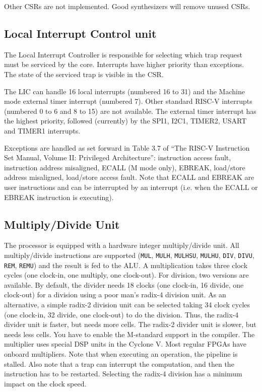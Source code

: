 \documentclass[12pt]{article}
\begin{document}
Other CSRs are not implemented. Good synthesizers will remove unused CSRs.

\subsection{Local Interrupt Control unit}
The Local Interrupt Controller is responsible for selecting which trap request must be serviced by the core. Interrupts have higher priority than exceptions. The state of the serviced trap is visible in the CSR.

The LIC can handle 16 local interrupts (numbered 16 to 31) and the Machine mode external timer interrupt (numbered 7). Other standard RISC-V interrupts (numbered 0 to 6 and 8 to 15) are not available. The external timer interrupt has the highest priority, followed (currently) by the SPI1, I2C1, TIMER2, USART and TIMER1 interrupts.

Exceptions are handled as set forward in Table 3.7 of ``The RISC-V Instruction Set Manual, Volume II: Privileged Architecture'': instruction access fault, instruction address misaligned, ECALL (M mode only), EBREAK, load/store address misaligned, load/store access fault. Note that ECALL and EBREAK are user instructions and can be interrupted by an interrupt (i.e. when the ECALL or EBREAK instruction is executing).

\subsection{Multiply/Divide Unit}
The processor is equipped with a hardware integer multiply/divide unit. All multiply/divide instructions are supported (\lstinline|MUL|, \lstinline|MULH|, \lstinline|MULHSU|, \lstinline|MULHU|, \lstinline|DIV|, \lstinline|DIVU|, \lstinline|REM|, \lstinline|REMU|) and the result is fed to the ALU. A multiplication takes three clock cycles (one clock-in, one multiply, one clock-out). For division, two versions are available. By default, the divider needs 18 clocks (one clock-in, 16 divide, one clock-out) for a division using a poor man's radix-4 division unit. As an alternative, a simple radix-2 division unit can be selected taking 34 clock cycles (one clock-in, 32 divide, one clock-out) to do the division.  Thus, the radix-4 divider unit is faster, but needs more cells. The radix-2 divider unit is slower, but needs less cells. You have to enable the M-standard support in the compiler. The multiplier uses special DSP units in the Cyclone V. Most regular FPGAs have onboard multipliers. Note that when executing an operation, the pipeline is stalled. Also note that a trap can interrupt the computation, and then the instruction has to be restarted. Selecting the radix-4 division has a minimum impact on the clock speed.
\end{document}

